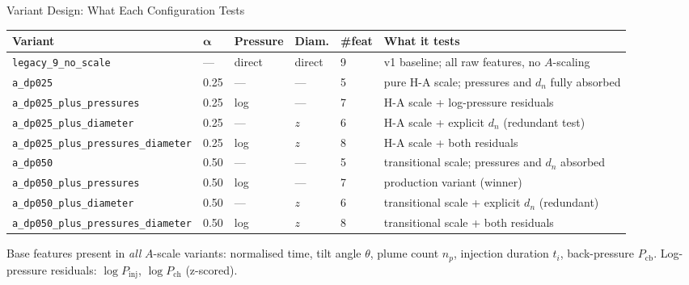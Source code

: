 \documentclass[UTF8,aspectratio=169]{ctexbeamer}
\newcommand{\good}[1]{\textcolor{green!45!black}{#1}}
\begin{document}
\begin{frame}{Variant Design: What Each Configuration Tests}
\small
\begin{center}
\renewcommand{\arraystretch}{1.18}
\begin{tabular}{@{}L{3.6cm} C{1.0cm} C{1.0cm} C{1.0cm} C{1.0cm} L{3.8cm}@{}}
\toprule
\textbf{Variant} & $\bm{\alpha}$ & \textbf{Pressure} & \textbf{Diam.} & \textbf{\#feat} & \textbf{What it tests} \\
\midrule
\texttt{legacy\_9\_no\_scale} & --- & direct & direct & 9 & v1 baseline; all raw features, no $A$-scaling \\
\addlinespace[0.3em]
\texttt{a\_dp025} & 0.25 & --- & --- & 5 & pure H-A scale; pressures and $d_n$ fully absorbed \\
\texttt{a\_dp025\_plus\_pressures} & 0.25 & log & --- & 7 & H-A scale + log-pressure residuals \\
\texttt{a\_dp025\_plus\_diameter} & 0.25 & --- & $z$ & 6 & H-A scale + explicit $d_n$ (redundant test) \\
\texttt{a\_dp025\_plus\_pressures\_diameter} & 0.25 & log & $z$ & 8 & H-A scale + both residuals \\
\addlinespace[0.3em]
\texttt{a\_dp050} & 0.50 & --- & --- & 5 & transitional scale; pressures and $d_n$ absorbed \\
\texttt{a\_dp050\_plus\_pressures} & \good{0.50} & \good{log} & --- & \good{7} & \good{production variant (winner)} \\
\texttt{a\_dp050\_plus\_diameter} & 0.50 & --- & $z$ & 6 & transitional scale + explicit $d_n$ (redundant) \\
\texttt{a\_dp050\_plus\_pressures\_diameter} & 0.50 & log & $z$ & 8 & transitional scale + both residuals \\
\bottomrule
\end{tabular}
\end{center}

\vspace{0.3em}
\footnotesize
Base features present in \emph{all} $A$-scale variants: normalised time, tilt angle $\theta$, plume count $n_p$, injection duration $t_i$, back-pressure $P_{\mathrm{cb}}$.
Log-pressure residuals: $\log P_{\mathrm{inj}}$, $\log P_{\mathrm{ch}}$ (z-scored).
\end{frame}
\end{document}
